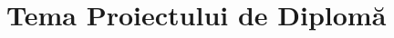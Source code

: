 \chapter*{Tema Proiectului de Diplomă}

\thispagestyle{front}
\pagestyle{front}

\newpage \
\newpage \
\newpage \
\newpage